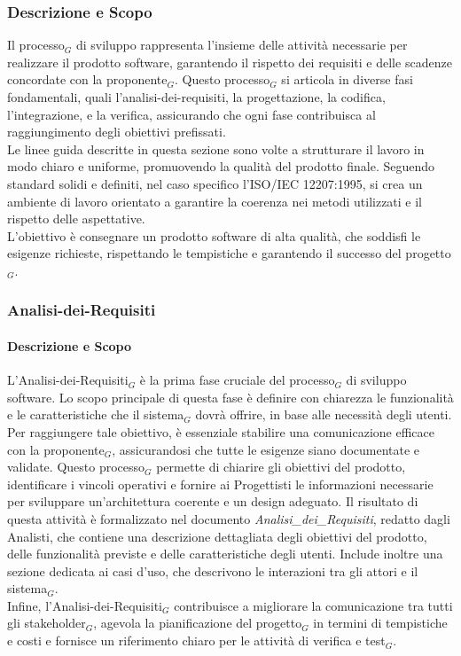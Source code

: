 \documentclass[10pt]{article}
\begin{document}
\begin{justify}
    \subsubsection{Descrizione e Scopo}
    Il processo$_G$ di sviluppo rappresenta l'insieme delle attività necessarie per realizzare il prodotto software, garantendo il rispetto dei requisiti e delle scadenze concordate con la proponente$_G$. Questo processo$_G$ si articola in diverse fasi fondamentali, quali l'analisi-dei-requisiti, la progettazione, la codifica, l'integrazione, e la verifica, assicurando che ogni fase contribuisca al raggiungimento degli obiettivi prefissati.\\
    Le linee guida descritte in questa sezione sono volte a strutturare il lavoro in modo chiaro e uniforme, promuovendo la qualità del prodotto finale. Seguendo standard solidi e definiti, nel caso specifico l'ISO/IEC 12207:1995, si crea un ambiente di lavoro orientato a garantire la coerenza nei metodi utilizzati e il rispetto delle aspettative.\\
    L'obiettivo è consegnare un prodotto software di alta qualità, che soddisfi le esigenze richieste, rispettando le tempistiche e garantendo il successo del progetto$_G$.\\

    \subsubsection{Analisi-dei-Requisiti}
    \label{analisi}
        \paragraph{Descrizione e Scopo}
        L'Analisi-dei-Requisiti$_G$ è la prima fase cruciale del processo$_G$ di sviluppo software. Lo scopo principale di questa fase è definire con chiarezza le funzionalità e le caratteristiche che il sistema$_G$ dovrà offrire, in base alle necessità degli utenti. Per raggiungere tale obiettivo, è essenziale stabilire una comunicazione efficace con la proponente$_G$, assicurandosi che tutte le esigenze siano documentate e validate. Questo processo$_G$ permette di chiarire gli obiettivi del prodotto, identificare i vincoli operativi e fornire ai Progettisti le informazioni necessarie per sviluppare un'architettura coerente e un design adeguato. Il risultato di questa attività è formalizzato nel documento \textit{Analisi\_dei\_Requisiti}, redatto dagli Analisti, che contiene una descrizione dettagliata degli obiettivi del prodotto, delle funzionalità previste e delle caratteristiche degli utenti. Include inoltre una sezione dedicata ai casi d'uso, che descrivono le interazioni tra gli attori e il sistema$_G$.\\
        Infine, l'Analisi-dei-Requisiti$_G$ contribuisce a migliorare la comunicazione tra tutti gli stakeholder$_G$, agevola la pianificazione del progetto$_G$ in termini di tempistiche e costi e fornisce un riferimento chiaro per le attività di verifica e test$_G$.\\


\end{justify}
\end{document}
